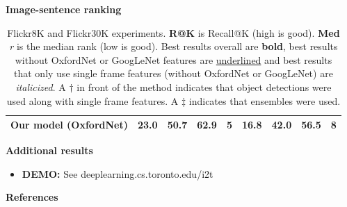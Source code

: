 \documentclass[serif,mathserif,final]{beamer}
\begin{document}
\begin{frame}{}
\begin{columns}[t]
\begin{column}{0.32\linewidth}
\begin{block}{\bf{\large Image-sentence ranking}}
\begin{table}[t]
\begin{tabulary}{\linewidth}{L|CCCC|CCCC}
    Our model (OxfordNet) & \textbf{23.0} & \textbf{50.7} & \textbf{62.9} & \textbf{5} & \textbf{16.8} & \textbf{42.0} & \textbf{56.5} & 8 \\
    \hline
  \end{tabulary}
  \caption{{\small Flickr8K and Flickr30K experiments. \textbf{R@K} is Recall@K
      (high is good). \textbf{Med} {\it r} is the median rank (low is
      good). Best results overall are \textbf{bold}, best results without
      OxfordNet or GoogLeNet features are \underline{underlined} and best
      results that only use single frame features (without OxfordNet or
      GoogLeNet) are \textit{italicized}. A $\dagger$ in front of the method
      indicates that object detections were used along with single frame
      features. A $\ddagger$ indicates that ensembles were used.}} 
  \label{fig:f30}
  \vspace{-0.1in}
  \end{table}
\end{block}    
\vfill

\begin{block}{\bf{\large Additional results}}
  \begin{itemize}
  \item \textbf{DEMO:} See deeplearning.cs.toronto.edu/i2t 
  \end{itemize}
\end{block}
\vfill

\begin{block}{\bf{\large References}}
  \footnotesize{}
  \footnotesize{}
\end{block}

\endminipage
\end{column}%
\end{columns}
\end{frame}
\end{document}
